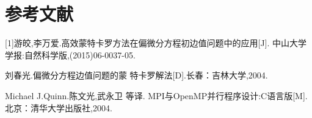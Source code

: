 \documentclass[UTF8,a4paper,notitlepage]{ctexart}%
\theoremstyle{nonumberplain}
\begin{document}
\section{参考文献}
{\raggedright
[1]游皎,李万爱.高效蒙特卡罗方法在偏微分方程初边值问题中的应用[J].
中山大学学报:自然科学版,(2015)06-0037-05.\par
[2]刘春光.偏微分方程边值问题的蒙
特卡罗解法[D].长春：吉林大学,2004.\par
[3]Michael J.Quinn.陈文光,武永卫 等译.
MPI与OpenMP并行程序设计:C语言版[M].北京：清华大学出版社,2004.
}
\end{document}
